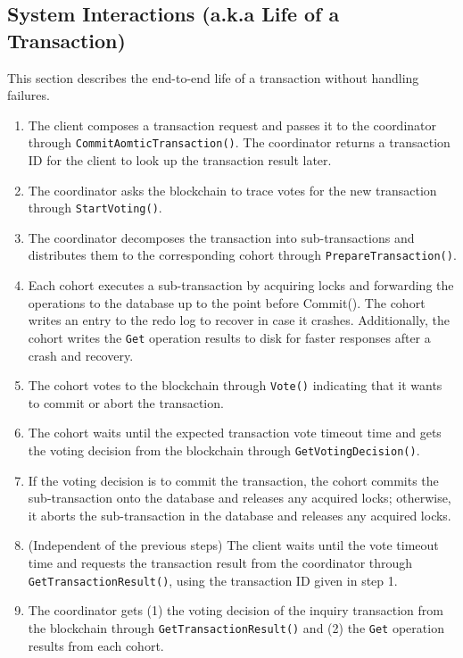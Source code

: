 \documentclass[11pt,conference]{IEEEtran}
\begin{document}
\subsection{System Interactions (a.k.a Life of a Transaction)} \label{txnflow}

This section describes the end-to-end life of a transaction without handling failures.

\begin{enumerate}
  \item The client composes a transaction request and passes it to the coordinator through \texttt{CommitAomticTransaction()}. The coordinator returns a transaction ID for the client to look up the transaction result later.
  \item The coordinator asks the blockchain to trace votes for the new transaction through \texttt{StartVoting()}.
  \item The coordinator decomposes the transaction into sub-transactions and distributes them to the corresponding cohort through \texttt{PrepareTransaction()}.
  \item Each cohort executes a sub-transaction by acquiring locks and forwarding the operations to the database up to the point before Commit(). The cohort writes an entry to the redo log to recover in case it crashes. Additionally, the cohort writes the \texttt{Get} operation results to disk for faster responses after a crash and recovery.
  \item The cohort votes to the blockchain through \texttt{Vote()} indicating that it wants to commit or abort the transaction.
  \item The cohort waits until the expected transaction vote timeout time and gets the voting decision from the blockchain through \texttt{GetVotingDecision()}.
  \item If the voting decision is to commit the transaction, the cohort commits the sub-transaction onto the database and releases any acquired locks; otherwise, it aborts the sub-transaction in the database and releases any acquired locks.
  \item (Independent of the previous steps) The client waits until the vote timeout time and requests the transaction result from the coordinator through \texttt{GetTransactionResult()}, using the transaction ID given in step 1.
  \item The coordinator gets (1) the voting decision of the inquiry transaction from the blockchain through \texttt{GetTransactionResult()} and (2) the \texttt{Get} operation results from each cohort.
\end{enumerate}
\end{document}
